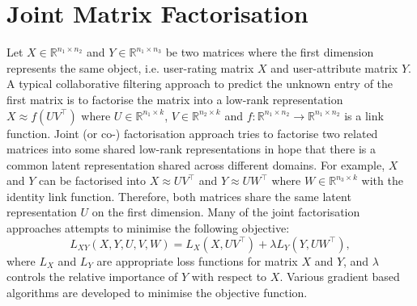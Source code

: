 \documentclass{article} %
\theoremstyle{definition}
\begin{document}
\section{Joint Matrix Factorisation}
Let $X \in \mathbb{R}^{n_1 \times n_2}$ and $Y \in \mathbb{R}^{n_1 \times n_3}$ be two matrices where the first dimension represents the same object, i.e. user-rating matrix $X$ and user-attribute matrix $Y$. A typical collaborative filtering approach to predict the unknown entry of the first matrix is to factorise the matrix into a low-rank representation $X \approx f(UV^\top)$ where $U\in\mathbb{R}^{n_1\times k}$, $V\in \mathbb{R}^{n_2 \times k}$ and $f:\mathbb{R}^{n_1 \times n_2} \rightarrow \mathbb{R} ^{n_1 \times n_2}$ is a link function. Joint (or co-) factorisation approach tries to factorise two related matrices into some shared low-rank representations in hope that there is a common latent representation shared across different domains. For example, $X$ and $Y$ can be factorised into $X \approx UV^\top$ and $Y \approx UW^\top$ where $W \in \mathbb{R}^{n_3 \times k}$ with the identity link function. Therefore, both matrices share the same latent representation $U$ on the first dimension.
Many of the joint factorisation approaches attempts to minimise the following objective:
\begin{equation}
\label{eqn:joint_obj}
L_{XY}(X,Y,U,V,W) = L_X(X, UV^\top) + \lambda L_Y(Y, UW^\top),
\end{equation}
where $L_X$ and $L_Y$ are appropriate loss functions for matrix $X$ and $Y$, and $\lambda$ controls the relative importance of $Y$ with respect to $X$. Various gradient based algorithms are developed to minimise the objective function.
\end{document}
